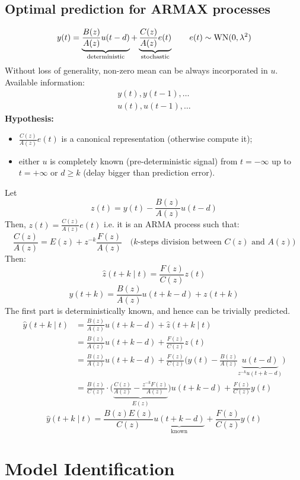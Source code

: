 \section{Optimal prediction for ARMAX processes}

\[
	y(t)=\underbrace{\frac{B(z)}{A(z)} u(t-d)}_{\text{deterministic}}+
	\underbrace{\frac{C(z)}{A(z)} e(t)}_{\text{stochastic}}\qquad e(t)\sim \operatorname{WN}(0,\lambda^2 )
\]
Without loss of generality, non-zero mean can be always incorporated in $u$. Available information:
\begin{gather*}
	y(t),y(t-1),\ldots \\
	u(t),u(t-1),\ldots
\end{gather*}
\textbf{Hypothesis:}
\begin{itemize}
	\item $\frac{C(z)}{A(z)}e(t)$ is a canonical representation (otherwise compute it);
	\item either $u$ is completely known (pre-deterministic signal) from $t=-\infty$ up to $t=+\infty$ or $d\geq k$ (delay bigger than prediction error).
\end{itemize}
Let 
$$
	z(t)=y(t)-\frac{B(z)}{A(z)} u(t-d)
$$
Then, $z(t)=\frac{C(z)}{A(z)} e(t)$ i.e. it is an ARMA process such that:
$$
	\frac{C(z)}{A(z)}=E(z)+z^{-k} \frac{F(z)}{A(z)} \quad\text{($k$-steps division between $C(z)$ and $A(z)$)}
$$
Then:
$$
	\hat{z}(t+k \mid t)=\frac{F(z)}{C(z)} z(t)
$$
$$
	y(t+k)=\frac{B(z)}{A(z)} u(t+k-d)+z(t+k)
$$
The first part is deterministically known, and hence can be trivially predicted.
\begin{align*}
	\hat{y}(t+k \mid t)&=\frac{B(z)}{A(z)} u(t+k-d)+\hat{z}(t+k \mid t) \\
	&=\frac{B(z)}{A(z)} u(t+k-d)+\frac{F(z)}{C(z)} z(t) \\
	& =\frac{B(z)}{A(z)} u(t+k-d)+\frac{F(z)}{C(z)}\Bigg(y(t)-\frac{B(z)}{A(z)} \underbrace{u(t-d)}_{z^{-k}u(t+k-d)}\Bigg) \\
	&=\frac{B(z)}{C(z)} \cdot\Bigg(\underbrace{\frac{C(z)}{A(z)}-\frac{z^{-k} F(z)}{A(z)}}_{E(z)}\Bigg) u(t+k-d)+\frac{F(z)}{C(z)} y(t)
\end{align*}
$$
	\boxed{\hat{y}(t+k \mid t) =\frac{B(z) E(z)}{C(z)} \underbrace{u(t+k-d)}_{\text{known}}+\frac{F(z)}{C(z)} y(t)}
$$

\chapter{Model Identification}

